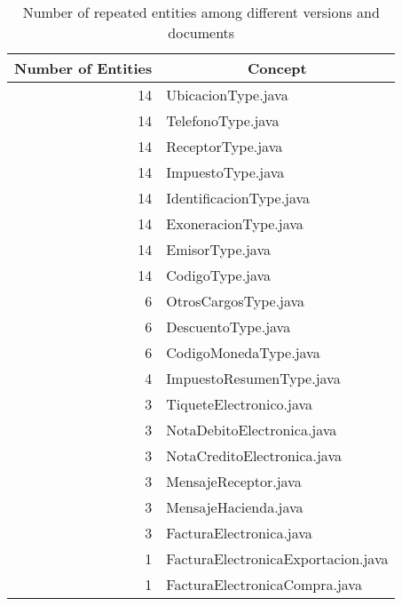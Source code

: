 \documentclass{article}
\begin{document}
\begin{table}[ht]
\begin{tabular}{@{}rl@{}}
\toprule
\textbf{Number of Entities} & \multicolumn{1}{c}{\textbf{Concept}} \\ \midrule
14                          & UbicacionType.java                   \\
14                          & TelefonoType.java                    \\
14                          & ReceptorType.java                    \\
14                          & ImpuestoType.java                    \\
14                          & IdentificacionType.java              \\
14                          & ExoneracionType.java                 \\
14                          & EmisorType.java                      \\
14                          & CodigoType.java                      \\
6                           & OtrosCargosType.java                 \\
6                           & DescuentoType.java                   \\
6                           & CodigoMonedaType.java                \\
4                           & ImpuestoResumenType.java             \\
3                           & TiqueteElectronico.java              \\
3                           & NotaDebitoElectronica.java           \\
3                           & NotaCreditoElectronica.java          \\
3                           & MensajeReceptor.java                 \\
3                           & MensajeHacienda.java                 \\
3                           & FacturaElectronica.java              \\
1                           & FacturaElectronicaExportacion.java   \\
1                           & FacturaElectronicaCompra.java        \\ \bottomrule
\end{tabular}
\caption{Number of repeated entities among different versions and documents}
\label{tbl:entities-repeated}
\end{table}

\medskip

\end{document}
